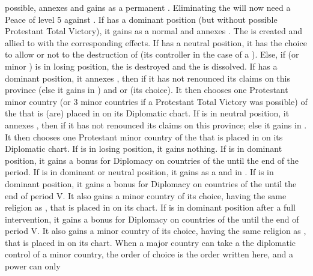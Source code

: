 \begin{digressions}
  possible, \paysHanse annexes \provinceOldenburg and \HOL gains \paysHanse as
  a permanent \VASSAL.  Eliminating the  will now need a Peace of level 5 against \HOL.
  \bparag If \HOLhol has a dominant position (but without possible Protestant
  Total Victory), it gains \paysHanse as a normal \VASSAL and \paysHanse
  annexes \provinceOldenburg. The  is
  created and allied to \HOLhol with the corresponding effects.
  \bparag If \HOL has a neutral position, it has the choice to allow or not to
  the destruction of \paysHanse (its controller in the case of a \HOLmin).
  \bparag Else, if \HOL (or minor \payshollande) is in losing position, the
  \paysHanse is destroyed and the  is
  dissolved.
  \aparag[Sweden]
  \bparag If \SUE has a dominant position, it annexes \provinceMecklenburg,
  then  if it has not renounced its claims on this
  province (else it gains \paysBrandebourg in \EG) and \provinceBremen or
  \provinceLubeck (its choice). It then chooses one Protestant minor country
  (or 3 minor countries if a Protestant Total Victory was possible) of the
  \HRE that is (are) placed in \EG on its Diplomatic chart.
  \bparag If \SUE is in neutral position, it annexes \provinceMecklenburg,
  then  if it has not renounced its claims on this
  province; else it gains \paysBrandebourg in \EG. It then chooses one
  Protestant minor country of the \HRE that is placed in \EG on its Diplomatic
  chart.
  \bparag If \SUE is in losing position, it gains nothing.
  \aparag[France]
  \bparag If \FRA is in dominant position, it gains a  bonus for
  Diplomacy on countries of the \HRE until the end of the period.
  \bparag If \FRA is in dominant or neutral position, it gains \paysAlsace as
  a \VASSAL and \paysCologne in \EC.
  \aparag[England] If \ENG is in dominant position, it gains a 
  bonus for Diplomacy on countries of the \HRE until the end of period V.  It
  also gains a minor country of its choice, having the same religion as \ENG,
  that is placed in \EG on its chart.
  \aparag[Poland] If \POL is in dominant position after a full intervention,
  it gains a  bonus for Diplomacy on countries of the \HRE until the
  end of period V.  It also gains a minor country of its choice, having the
  same religion as \POL, that is placed in \EG on its chart.
  \aparag When a major country can take a the diplomatic control of a minor
  country, the order of choice is the order written here, and a power can only

\end{digressions}
